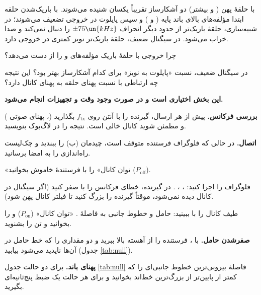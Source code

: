 \documentclass[a4paper,11pt]{article}
\begin{document}
\begin{expectbox}
با حلقهٔ پهن
(
و بیشتر) دو آشکارساز تقریباً یکسان شنیده می‌شوند. با باریک‌شدن حلقه ابتدا مؤلفه‌های بالای باند پایه
(
و
)
و سپس پایلوت در خروجی
تضعیف می‌شوند؛ در شبیه‌سازی، حلقهٔ باریک‌تر از حدود
دیگر انحراف
$\pm 75\un{kHz}$
را دنبال نمی‌کند و صدا خراب می‌شود. در سیگنال ضعیف، حلقهٔ باریک‌تر نویز کمتری در خروجی دارد.
\end{expectbox}

\begin{question}
چرا خروجی
با حلقهٔ باریک مؤلفه‌های
و
را از دست می‌دهد؟
\end{question}
\begin{question}
در سیگنال ضعیف، نسبت «پایلوت به نویز» برای کدام آشکارساز بهتر بود؟ این نتیجه چه ارتباطی با نسبت پهنای حلقه به پهنای کانال دارد؟
\end{question}

\label{part:link}
\noindent\textbf{این بخش اختیاری است و در صورت وجود وقت و تجهیزات انجام می‌شود.}
\begin{steps}
\item \textbf{بررسی فرکانس.} پیش از هر ارسال، گیرنده را با آنتن روی
$f_{\mathrm{tx}}$
بگذارید
(،
پهنای صوتی
)
و مطمئن شوید کانال خالی است. نتیجه را در لاگ‌بوک بنویسید.
\item \textbf{اتصال.} در حالی که فلوگراف فرستنده متوقف است، چیدمان (ب) را ببندید و چک‌لیست راه‌اندازی را به امضا برسانید.
\item «توان کانال» را با فرستندهٔ خاموش بخوانید
($P_{\mathrm{off}}$).
\item فلوگراف
را اجرا کنید:
،
،
.
در گیرنده، خطای فرکانس را با
صفر کنید (اگر سیگنال در کانال دیده نمی‌شود، موقتاً
گیرنده را بزرگ کنید تا فیلتر کانال پهن شود).
\item طیف کانال را با
ببینید: حامل و خطوط جانبی به فاصلهٔ
.
«توان کانال»
($P_{\mathrm{on}}$)
و
را بخوانید و تن را بشنوید.
\item \textbf{صفرشدن حامل.} با
،
فرستنده را از
آهسته بالا ببرید و دو مقداری را که خط حامل در آن‌ها ناپدید می‌شود بیابید (جدول
\ref{tab:null}).
\item \textbf{پهنای باند.} برای دو حالت جدول
\ref{tab:null}
فاصلهٔ بیرونی‌ترین خطوط جانبی‌ای را که کمتر از
پایین‌تر از بزرگ‌ترین خط‌اند بخوانید و برای هر حالت یک ضبط پنج‌ثانیه‌ای بگیرید.
\end{steps}
\end{document}
